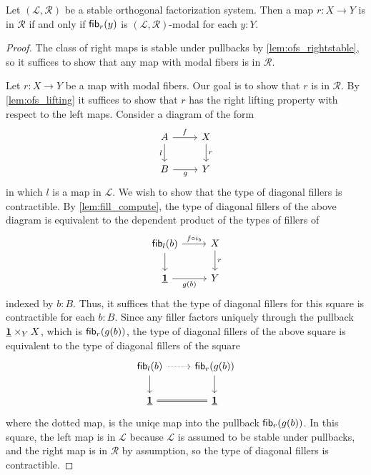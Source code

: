 \begin{lem}\label{lem:sofs_rfib}
Let $(\mathcal{L},\mathcal{R})$ be a stable orthogonal factorization system.
Then a map $r:X\to Y$ is in $\mathcal{R}$ if and only if $\mathsf{fib}_{r}(y)$
is $(\mathcal{L},\mathcal{R})$-modal for each $y:Y$.
\end{lem}

\begin{proof}
The class of right maps is stable under pullbacks by \autoref{lem:ofs_rightstable},
so it suffices to show that any map with modal fibers is in $\mathcal{R}$.

Let $r:X\to Y$ be a map with modal fibers. Our goal is to show that
$r$ is in $\mathcal{R}$. By \autoref{lem:ofs_lifting} it suffices to show that
$r$ has the right lifting property with respect to the left maps.
Consider a diagram of the form
\begin{equation*}
\begin{tikzcd}
A \arrow[d,swap,"l"] \arrow[r,"f"] & X \arrow[d,"r"] \\
B \arrow[r,swap,"g"] & Y
\end{tikzcd}
\end{equation*}
in which $l$ is a map in $\mathcal{L}$.
We wish to show that the type of diagonal fillers is contractible.
By \autoref{lem:fill_compute}, the type of diagonal fillers of the above diagram
is equivalent to the dependent product of the types of fillers of
\begin{equation*}
\begin{tikzcd}
\fib{l}{b} \arrow[d] \arrow[r,"f\circ i_b"] & X \arrow[d,"r"] \\
\unit \arrow[r,swap,"g(b)"] & Y
\end{tikzcd}
\end{equation*}
indexed by $b:B$. Thus, it suffices that the type of diagonal fillers for this
square is contractible for each $b:B$. Since any filler factors uniquely through
the pullback $\underline{\mathbf{1}}\times_Y X$, which is $\mathsf{fib}_{r}(g(b))$, the type of diagonal
fillers of the above square is equivalent to the type of diagonal fillers of the
square
\begin{equation*}
\begin{tikzcd}
\fib{l}{b} \arrow[d] \arrow[r,densely dotted] & \fib{r}{g(b)} \arrow[d] \\
\unit \arrow[r,equals] & \unit
\end{tikzcd}
\end{equation*}
where the dotted map, is the uniqe map into the pullback $\mathsf{fib}_{r}(g(b))$. In
this square, the left map is in $\mathcal{L}$ because $\mathcal{L}$ is assumed
to be stable under pullbacks, and the right map is in $\mathcal{R}$ by assumption,
so the type of diagonal fillers is contractible.
\end{proof}

